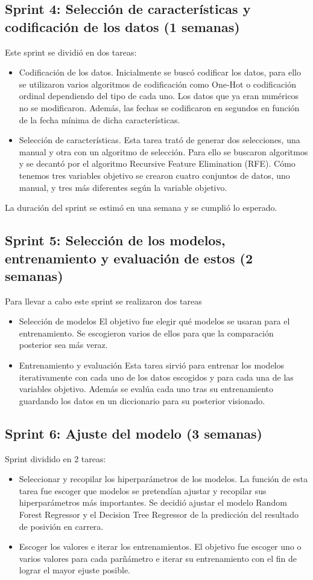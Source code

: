 \subsection{Sprint 4: Selección de características y codificación de los datos (1 semanas)}
Este sprint se dividió en dos tareas:
\begin{itemize}
\item 
    Codificación de los datos.
    Inicialmente se buscó codificar los datos, para ello se utilizaron varios algoritmos de codificación como One-Hot o codificación ordinal dependiendo del tipo de cada uno. Los datos que ya eran numéricos no se modificaron. Además, las fechas se codificaron en segundos en función de la fecha mínima de dicha características.
    \item 
    Selección de características.
    Esta tarea trató de generar dos selecciones, una manual y otra con un algoritmo de selección. Para ello se buscaron algoritmos y se decantó por el algoritmo Recursive Feature Elimination (RFE). Cómo tenemos tres variables objetivo se crearon cuatro conjuntos de datos, uno manual, y tres más diferentes según la variable objetivo.
\end{itemize}
La duración del sprint se estimó en una semana y se cumplió lo esperado.

\subsection{Sprint 5: Selección de los modelos, entrenamiento y evaluación de estos (2 semanas)}
Para llevar a cabo este sprint se realizaron dos tareas
\begin{itemize}
    \item Selección de modelos
    El objetivo fue elegir qué modelos se usaran para el entrenamiento. Se escogieron varios de ellos para que la comparación posterior sea más veraz.
    \item Entrenamiento y evaluación
    Esta tarea sirvió para entrenar los modelos iterativamente con cada uno de los datos escogidos y para cada una de las variables objetivo. Además se evalúa cada uno tras su entrenamiento guardando los datos en un diccionario para su posterior visionado.
\end{itemize}

\subsection{Sprint 6: Ajuste del modelo (3 semanas)}
Sprint dividido en 2 tareas:
\begin{itemize}
    \item 
    Seleccionar y recopilar los hiperparámetros de los modelos.
    La función de esta tarea fue escoger que modelos se pretendían ajustar y recopilar sus hiperparámetros más importantes. Se decidió ajustar el modelo Random Forest Regressor y el Decision Tree Regressor de la predicción del resultado de posivión en carrera.
    \item 
    Escoger los valores e iterar los entrenamientos.
    El objetivo fue escoger uno o varios valores para cada parñámetro e iterar su entrenamiento con el fin de lograr el mayor ejuste posible.
\end{itemize}


